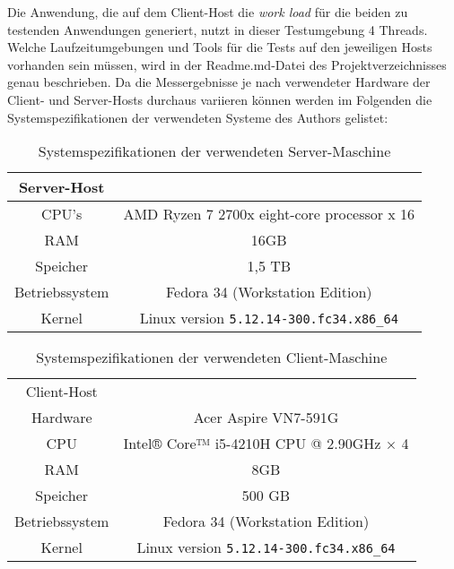 Die Anwendung, die auf dem Client-Host die \textit{work load} für die beiden zu testenden Anwendungen generiert,
nutzt in dieser Testumgebung 4 Threads.
Welche Laufzeitumgebungen und Tools für die Tests auf den jeweiligen Hosts vorhanden sein müssen,
wird in der Readme.md-Datei des Projektverzeichnisses genau beschrieben.
Da die Messergebnisse je nach verwendeter Hardware der Client- und Server-Hosts durchaus variieren können werden im Folgenden
die Systemspezifikationen der verwendeten Systeme des Authors gelistet:
\begin{table}[ht!]
    \centering
    \begin{tabular}{| c | c |}
        \hline
        Server-Host                                                  \\
        \hline
        CPU's          & AMD Ryzen 7 2700x eight-core processor x 16 \\
        \hline
        RAM            & 16GB                                        \\
        \hline
        Speicher       & 1,5 TB                                      \\
        \hline
        Betriebssystem & Fedora 34 (Workstation Edition)             \\
        \hline
        Kernel         & Linux version \verb|5.12.14-300.fc34.x86_64|    \\
        \hline
    \end{tabular}
    \caption{Systemspezifikationen der verwendeten Server-Maschine}
    \label{table:system_host}
\end{table}

\begin{table}[ht!]
    \centering
    \begin{tabular}{| c | c |}
        \hline
        Client-Host                                               \\
        Hardware       & Acer Aspire VN7-591G                     \\
        \hline
        CPU            & Intel® Core™ i5-4210H CPU @ 2.90GHz × 4  \\
        \hline
        RAM            & 8GB                                      \\
        \hline
        Speicher       & 500 GB                                   \\
        \hline
        Betriebssystem & Fedora 34 (Workstation Edition)          \\
        \hline
        Kernel         & Linux version \verb|5.12.14-300.fc34.x86_64| \\
        \hline
    \end{tabular}
    \caption{Systemspezifikationen der verwendeten Client-Maschine}
    \label{table:system_client}
\end{table}

